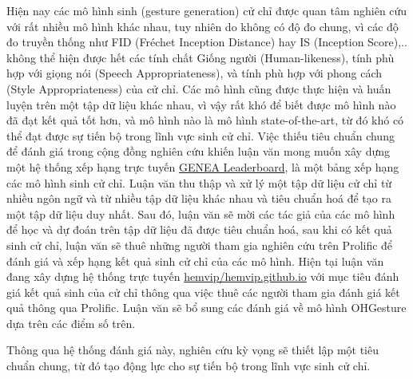 Hiện nay các mô hình sinh (gesture generation) cử chỉ được quan tâm nghiên cứu với rất nhiều mô hình khác nhau, tuy nhiên do không có độ đo chung, vì các độ đo truyền thống như FID (Fréchet Inception Distance) hay IS (Inception Score),.. không thể hiện được hết các tính chất Giống người (Human-likeness), tính phù hợp với giọng nói (Speech Appropriateness), và tính phù hợp với phong cách (Style Appropriateness) của cử chỉ. Các mô hình cũng được thực hiện và huấn luyện trên một tập dữ liệu khác nhau, vì vậy rất khó để biết được mô hình nào đã đạt kết quả tốt hơn, và mô hình nào là mô hình state-of-the-art, từ đó khó có thể đạt được sự tiến bộ trong lĩnh vực sinh cử chỉ. Việc thiếu tiêu chuẩn chung để đánh giá trong cộng đồng nghiên cứu khiến luận văn mong muốn xây dựng một hệ thống xếp hạng trực tuyến \cite{nagy2024towards} \hyperlink{https://genea-workshop.github.io/leaderboard/}{GENEA Leaderboard}, là một bảng xếp hạng các mô hình sinh cử chỉ. Luận văn thu thập và xử lý một tập dữ liệu cử chỉ từ nhiều ngôn ngữ và từ nhiều tập dữ liệu khác nhau và tiêu chuẩn hoá để tạo ra một tập dữ liệu duy nhất.  Sau đó, luận văn sẽ mời các tác giả của các mô hình để học và dự đoán trên tập dữ liệu đã được tiêu chuẩn hoá, sau khi có kết quả sinh cử chỉ, luận văn sẽ thuê những người tham gia nghiên cứu trên Prolific để đánh giá và xếp hạng kết quả sinh cử chỉ của các mô hình. Hiện tại luận văn đang xây dựng hệ thống trực tuyến \hyperlink{https://github.com/hemvip/hemvip.github.io}{hemvip/hemvip.github.io} với mục tiêu đánh giá kết quả sinh của cử chỉ thông qua việc thuê các người tham gia đánh giá kết quả thông qua Prolific. Luận văn sẽ bổ sung các đánh giá về mô hình OHGesture dựa trên các điểm số trên.

Thông qua hệ thống đánh giá này, nghiên cứu kỳ vọng sẽ thiết lập một tiêu chuẩn chung, từ đó tạo động lực cho sự tiến bộ trong lĩnh vực sinh cử chỉ.



